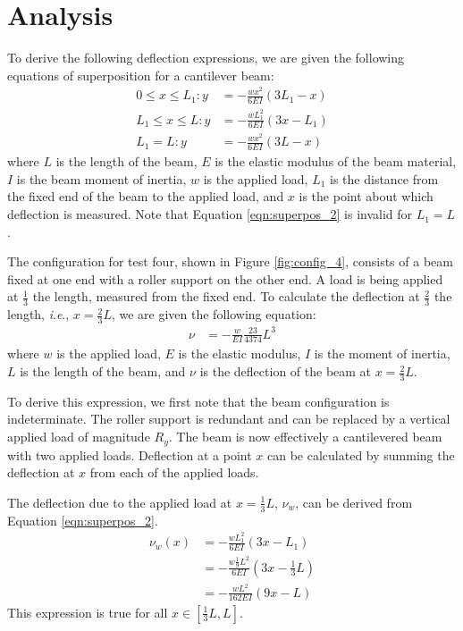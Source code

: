 \documentclass[12 pt]{article}
\newcommand{\ie}{\textit{i}.\textit{e}., }
\begin{document}
\section{Analysis} \label{analysis}
To derive the following deflection expressions, we are given the following equations of superposition for a cantilever beam:
\begin{align}
	0\le{}x\le{}L_1:y&=-\frac{wx^2}{6EI}(3L_1-x)\label{eqn:superpos_1}\\
	L_1\le{}x\le{}L:y&=-\frac{wL_1^2}{6EI}(3x-L_1)\label{eqn:superpos_2}\\
	L_1=L:y&=-\frac{wx^2}{6EI}(3L-x)\label{eqn:superpos_3}
\end{align}
where $L$ is the length of the beam, $E$ is the elastic modulus of the beam material, $I$ is the beam moment of inertia, $w$ is the applied load, $L_1$ is the distance from the fixed end of the beam to the applied load, and $x$ is the point about which deflection is measured. Note that Equation \ref{eqn:superpos_2} is invalid for $L_1=L$.

The configuration for test four, shown in Figure \ref{fig:config_4}, consists of a beam fixed at one end with a roller support on the other end. A load is being applied at $\frac{1}{3}$ the length, measured from the fixed end. To calculate the deflection at $\frac{2}{3}$ the length, \ie $x=\frac{2}{3}L$, we are given the following equation:
\begin{align} \label{eqn:config_4-deflection}
	\nu&=-\frac{w}{EI}\frac{23}{4374}L^3
\end{align}
where $w$ is the applied load, $E$ is the elastic modulus, $I$ is the moment of inertia, $L$ is the length of the beam, and $\nu$ is the deflection of the beam at $x=\frac{2}{3}L$.

To derive this expression, we first note that the beam configuration is indeterminate. The roller support is redundant and can be replaced by a vertical applied load of magnitude $R_y$. The beam is now effectively a cantilevered beam with two applied loads. Deflection at a point $x$ can be calculated by summing the deflection at $x$ from each of the applied loads.

The deflection due to the applied load at $x=\frac{1}{3}L$, $\nu_w$, can be derived from Equation \ref{eqn:superpos_2}.
\begin{align*}
	\nu_w(x)&=-\frac{wL_1^2}{6EI}(3x-L_1)\\
	&=-\frac{w\frac{1}{9}L^2}{6EI}(3x-\frac{1}{3}L)\\
	&=-\frac{wL^2}{162EI}(9x-L)
\end{align*}
This expression is true for all $x\in[\frac{1}{3}L,L]$.
\end{document}
